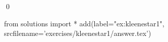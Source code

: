 
\begin{ex} 
  \label{ex:kleenestar1}
  
  \qed
\end{ex} 
\begin{python0}
from solutions import *
add(label="ex:kleenestar1",
    srcfilename='exercises/kleenestar1/answer.tex') 
\end{python0}

